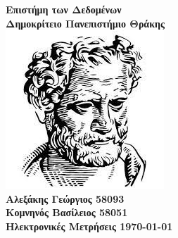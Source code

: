 
\begin{titlepage}
    \centering
    \bfseries
    \Huge
    Επιστήμη των Δεδομένων
    \\\vspace{1\baselineskip}
    \LARGE
    Δημοκρίτειο Πανεπιστήμιο Θράκης
    \\\vspace{2\baselineskip}
    \includegraphics{duth-logo.png}
    \\\vspace{3\baselineskip}
    \mdseries
    \large
    Αλεξάκης Γεώργιος \hspace{0.3\textwidth}58093
    \\\vspace{1\baselineskip}
    Κομνηνός Βασίλειος \hspace{0.3\textwidth}58051
    \\\vspace{2\baselineskip}
    \small
    Ηλεκτρονικές Μετρήσεις \hspace{0.2\textwidth}\today
\end{titlepage}